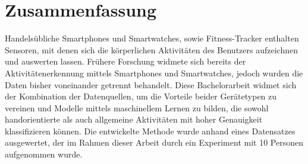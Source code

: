 \chapter*{Zusammenfassung}
Handelsübliche Smartphones und Smartwatches, sowie Fitness-Tracker enthalten Sensoren, mit denen sich die körperlichen Aktivitäten des Benutzers aufzeichnen und auswerten lassen. Frühere Forschung widmete sich bereits der Aktivitätenerkennung mittels Smartphones und Smartwatches, jedoch wurden die Daten bisher voneinander getrennt behandelt. Diese Bachelorarbeit widmet sich der Kombination der Datenquellen, um die Vorteile beider Gerätetypen zu vereinen und Modelle mittels maschinellem Lernen zu bilden, die sowohl handorientierte als auch allgemeine Aktivitäten mit hoher Genauigkeit klassifizieren können. Die entwickelte Methode wurde anhand eines Datensatzes ausgewertet, der im Rahmen dieser Arbeit durch ein Experiment mit 10 Personen aufgenommen wurde.

